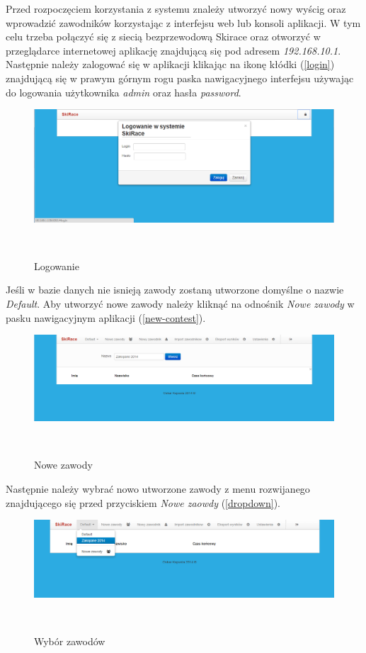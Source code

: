 \documentclass[11pt,a4paper, twoside]{article}
\begin{document}
Przed rozpoczęciem korzystania z systemu znależy utworzyć nowy wyścig oraz wprowadzić zawodników korzystając z interfejsu web lub konsoli aplikacji. W tym celu trzeba połączyć się z siecią bezprzewodową Skirace oraz otworzyć w przeglądarce internetowej aplikację znajdującą się pod adresem \emph{192.168.10.1}. Następnie należy zalogować się w aplikacji klikając na ikonę kłódki (\ref{login}) znajdującą się w prawym górnym rogu paska nawigacyjnego interfejsu używając do logowania użytkownika \emph{admin} oraz hasła \emph{password}.
\begin{figure}[H]
\centering
\includegraphics[scale=0.3]{./img/login.png}
\caption{Logowanie}
$\label{login}$
\end{figure}
\noindent
Jeśli w bazie danych nie isnieją zawody zostaną utworzone domyślne o nazwie \emph{Default}. Aby utworzyć nowe zawody należy kliknąć na odnośnik \emph{Nowe zawody} w pasku nawigacyjnym aplikacji (\ref{new-contest}). 	
\begin{figure}[H]
\centering
\includegraphics[scale=0.3]{./img/new-contest.png}
\caption{Nowe zawody}
$\label{new-contest}$
\end{figure}
\noindent
Następnie należy wybrać nowo utworzone zawody z menu rozwijanego znajdującego się przed przyciskiem \emph{Nowe zaowdy} (\ref{dropdown}).
\begin{figure}[H]
\centering
\includegraphics[scale=0.3]{./img/dropdown.png}
\caption{Wybór zawodów}
$\label{dropdown}$
\end{figure}
\end{document}
